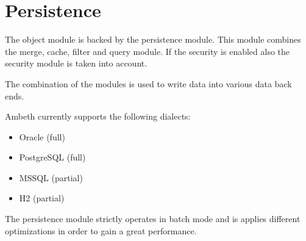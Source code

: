 \section{Persistence}
\label{module:Persistence}
\ClearAPI
The object module is backed by the persistence module. This module combines the merge, cache, filter and query module. If the security is enabled also the security module is taken into account.

The combination of the modules is used to write data into various data back ends.

Ambeth currently supports the following dialects:
\begin{itemize}
	\item Oracle (full)
	\item PostgreSQL (full)
	\item MSSQL (partial)
	\item H2 (partial)
\end{itemize}

The persistence module strictly operates in batch mode and is applies different optimizations in order to gain a great performance.

